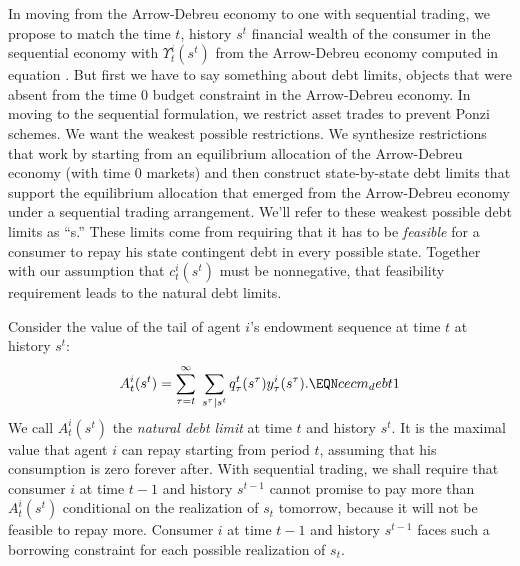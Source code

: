 In moving from  the Arrow-Debreu economy to one with sequential
trading, we propose to  match  the time $t$, history $s^{t}$ 
financial wealth of
the consumer  in the sequential economy with  
$\Upsilon^i_t(s^t)$ from the Arrow-Debreu economy computed in equation
. But first we have to say something about debt
limits, objects that were  absent from  the time $0$ budget constraint  in the Arrow-Debreu economy.
In moving to the sequential formulation, we    restrict asset trades to prevent Ponzi schemes.  We
want the weakest possible restrictions.  We
synthesize restrictions that work by starting from an equilibrium
allocation of the Arrow-Debreu economy (with time $0$ markets) and then construct  state-by-state debt limits that support
the equilibrium allocation that emerged from the Arrow-Debreu economy under a sequential trading arrangement.
 We'll refer to these weakest possible
debt limits as  ``s.'' These limits come
from  requiring that it has to be {\it
feasible\/} for a consumer to repay his state contingent debt in
every possible state.
Together with  our assumption that $c_t^i(s^t)$ must be nonnegative, that
feasibility requirement leads to the natural debt limits.




Consider the value of the tail of  agent $i$'s endowment sequence
at time $t$ at history $s^t$:
$$ A^i_t(s^t) =
   \sum_{\tau=t}^\infty \; \sum_{s^\tau \vert s^t}
    q^t_\tau(s^\tau) y_\tau^i(s^\tau).   \EQN cecm_debt1$$
 We call
$A^i_t(s^t)$ the {\it natural debt limit} at time $t$ and history
$s^t$. It is the  maximal value that agent $i$   can
repay starting from  period $t$, assuming that his consumption is
zero forever after.
With sequential trading, we shall require that consumer $i$ at time $t-1$ and
history $s^{t-1}$ cannot promise to pay more than $A^i_t(s^t)$
conditional on the realization of $s_t$ tomorrow, because it will
not be feasible to repay more. Consumer $i$ at
time $t-1$ and history $s^{t-1}$ faces  such  a borrowing constraint for each possible
realization of $s_t$.


